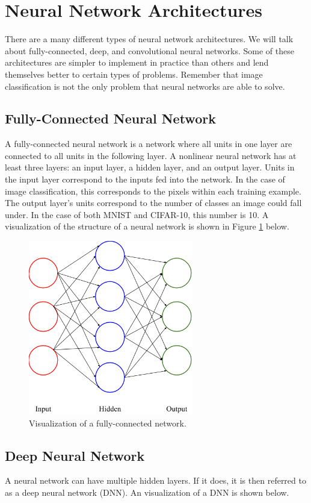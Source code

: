 \newpage
\section{Neural Network Architectures}\label{ch:neural_networks}
There are a many different types of neural network architectures. We will talk
about fully-connected, deep, and convolutional neural networks. Some of these
architectures are simpler to implement in practice than others and lend
themselves better to certain types of problems. Remember that image
classification is not the only problem that neural networks are able to solve.

\subsection{Fully-Connected Neural Network} A fully-connected neural network is
a network where all units in one layer are connected to all units in the
following layer. A nonlinear neural network has at least three layers: an input
layer, a hidden layer, and an output layer. Units in the input layer correspond
to the inputs fed into the network. In the case of image classification, this
corresponds to the pixels within each training example.  The output layer's
units correspond to the number of classes an image could fall under. In the
case of both MNIST and CIFAR-10, this number is 10.  A visualization of the
structure of a neural network is shown in Figure \ref{fig:nn} below.

\begin{figure}[ht!]
\centering
\includegraphics[height=3in]{../figures/neural_network.png}
\caption{Visualization of a fully-connected network.}
\label{fig:nn}
\end{figure}

\subsection{Deep Neural Network}
A neural network can have multiple hidden layers. If it does, it is then
referred to as a deep neural network (DNN). An visualization of a DNN is shown
below.

